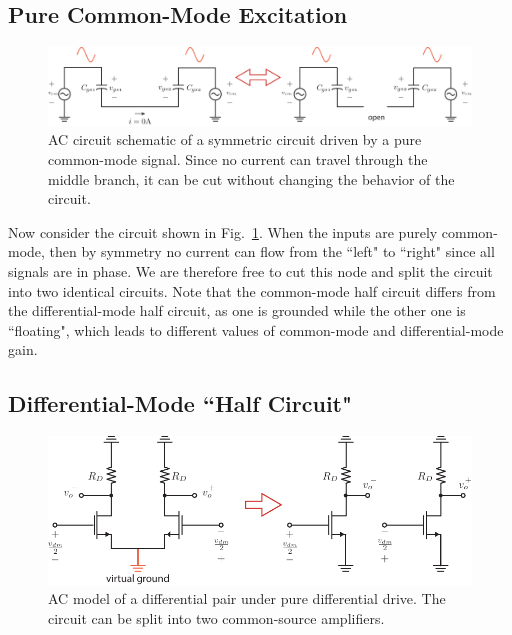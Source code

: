 \subsection{Pure Common-Mode Excitation}
\begin{figure}[tb]
\begin{center}
\includegraphics[width=\columnwidth]{CM_model.pdf}
\end{center}
\caption{AC circuit schematic of a symmetric circuit driven by a pure common-mode signal.  Since no current can travel through the middle branch, it can be cut without changing the behavior of the circuit.}
\label{fig:CM_model.pdf}
\end{figure}

Now consider the circuit shown in Fig.~\ref{fig:CM_model.pdf}.  When the inputs are purely common-mode, then by symmetry no current can flow from the ``left" to ``right" since all signals are in phase.  We are therefore free to cut this node and split the circuit into two identical circuits.  Note that the common-mode half circuit differs from the differential-mode half circuit, as one is grounded while the other one is ``floating", which leads to different values of common-mode and differential-mode gain.
\subsection{Differential-Mode ``Half Circuit"}
\begin{figure}[tb]
\begin{center}
\includegraphics[scale=1]{Diff_Pair_DM_Drive.pdf}
\end{center}
\caption{AC model of a differential pair under pure differential drive.   The circuit can be split into two common-source amplifiers.}
\label{fig:Diff_Pair_DM_Drive.pdf}
\end{figure}

